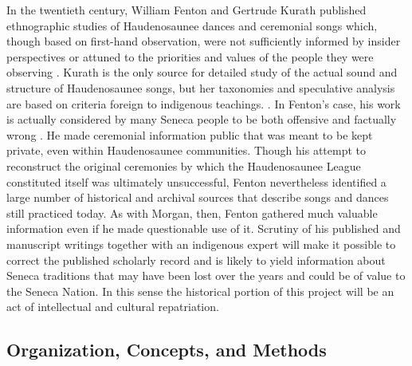 \documentclass{neh}
\begin{document}
In the twentieth century, William Fenton and Gertrude Kurath published
ethnographic studies of Haudenosaunee dances and ceremonial songs which,
though based on first-hand observation, were not sufficiently informed by
insider perspectives or attuned to the priorities and values of the people
they were observing
\Autocites{Fenton:GreatLaw}{FentonKurath:EagleDance}{Kurath:IroquoisMusic}.
Kurath is the only source for detailed study of the actual sound and structure
of Haudenosaunee songs, but her taxonomies and speculative analysis are based
on criteria foreign to indigenous teachings.
\Autocite{Caldwell:Kurath}.
In Fenton's case, his work is actually considered by many Seneca people to be
both offensive and factually wrong
\Autocite{McCarthy:Iroquoianist}.
He made ceremonial information public that was meant to be kept private, even
within Haudenosaunee communities.
Though his attempt to reconstruct the original ceremonies by which the
Haudenosaunee League constituted itself was ultimately unsuccessful, Fenton
nevertheless identified a large number of historical and archival sources that
describe songs and dances still practiced today.
As with Morgan, then, Fenton gathered much valuable information even if he
made questionable use of it.
Scrutiny of his published and manuscript writings together with an indigenous
expert will make it possible to correct the published scholarly record and is
likely to yield information about Seneca traditions that may have been lost
over the years and could be of value to the Seneca Nation.
In this sense the historical portion of this project will be an act of
intellectual and cultural repatriation.

\Autocites
{Krouse:IroquoisSocials}


\subsection{Organization, Concepts, and Methods}


\end{document}
